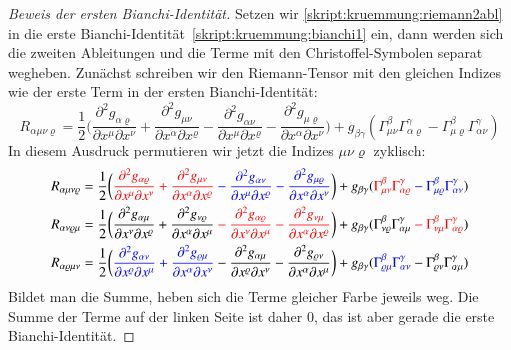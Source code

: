 \begin{proof}[Beweis der ersten Bianchi-Identität]
Setzen wir \eqref{skript:kruemmung:riemann2abl} in die erste
Bianchi-Identität~\eqref{skript:kruemmung:bianchi1} ein, dann werden
sich die zweiten Ableitungen und die Terme mit den Christoffel-Symbolen
separat wegheben.
Zunächst schreiben wir den Riemann-Tensor mit den gleichen Indizes wie
der erste Term in der ersten Bianchi-Identität:
\begin{equation}
R_{\alpha\mu\nu\varrho}
=
\frac12\biggl(
\frac{\partial^2 g_{\alpha\varrho}}{\partial x^\mu\partial x^\nu}
+
\frac{\partial^2 g_{\mu\nu}}{\partial x^\alpha\partial x^\varrho}
-
\frac{\partial^2 g_{\alpha\nu}}{\partial x^\mu\partial x^\varrho}
-
\frac{\partial^2 g_{\mu\varrho}}{\partial x^\alpha\partial x^\nu}
\biggr)
+g_{\beta\gamma}(
\Gamma^\beta_{\mu\nu}\Gamma^\gamma_{\alpha\varrho}
-
\Gamma^\beta_{\mu\varrho}\Gamma^\gamma_{\alpha\nu}
)
\end{equation}
In diesem Ausdruck permutieren wir jetzt die Indizes $\mu\nu\varrho$
zyklisch:
\begin{align*}
R_{\alpha\mu\nu\varrho}
&=
\frac12\biggl(
{\color{red}
\frac{\partial^2 g_{\alpha\varrho}}{\partial x^\mu\partial x^\nu}
+
\frac{\partial^2 g_{\mu\nu}}{\partial x^\alpha\partial x^\varrho}}
{\color{blue}\mathstrut
-
\frac{\partial^2 g_{\alpha\nu}}{\partial x^\mu\partial x^\varrho}
-
\frac{\partial^2 g_{\mu\varrho}}{\partial x^\alpha\partial x^\nu}}
\biggr)
+g_{\beta\gamma}(
{\color{red}
\Gamma^\beta_{\mu\nu}\Gamma^\gamma_{\alpha\varrho}}
{\color{blue}\mathstrut
-
\Gamma^\beta_{\mu\varrho}\Gamma^\gamma_{\alpha\nu}}
)
\\
R_{\alpha\nu\varrho\mu}
&=
\frac12\biggl(
\frac{\partial^2 g_{\alpha\mu}}{\partial x^\nu\partial x^\varrho}
+
\frac{\partial^2 g_{\nu\varrho}}{\partial x^\alpha\partial x^\mu}
{\color{red}\mathstrut
-
\frac{\partial^2 g_{\alpha\varrho}}{\partial x^\nu\partial x^\mu}
-
\frac{\partial^2 g_{\nu\mu}}{\partial x^\alpha\partial x^\varrho}}
\biggr)
+g_{\beta\gamma}(
\Gamma^\beta_{\nu\varrho}\Gamma^\gamma_{\alpha\mu}
{\color{red}\mathstrut
-
\Gamma^\beta_{\nu\mu}\Gamma^\gamma_{\alpha\varrho}}
)
\\
R_{\alpha\varrho\mu\nu}
&=
\frac12\biggl(
{\color{blue}\mathstrut
\frac{\partial^2 g_{\alpha\nu}}{\partial x^\varrho\partial x^\mu}
+
\frac{\partial^2 g_{\varrho\mu}}{\partial x^\alpha\partial x^\nu}}
-
\frac{\partial^2 g_{\alpha\mu}}{\partial x^\varrho\partial x^\nu}
-
\frac{\partial^2 g_{\varrho\nu}}{\partial x^\alpha\partial x^\mu}
\biggr)
+g_{\beta\gamma}(
{\color{blue}
\Gamma^\beta_{\varrho\mu}\Gamma^\gamma_{\alpha\nu}}
-
\Gamma^\beta_{\varrho\nu}\Gamma^\gamma_{\alpha\mu}
)
\end{align*}
Bildet man die Summe, heben sich die Terme gleicher Farbe jeweils weg.
Die Summe der Terme auf der linken Seite ist daher $0$, das ist aber
gerade die erste Bianchi-Identität.
\end{proof}

